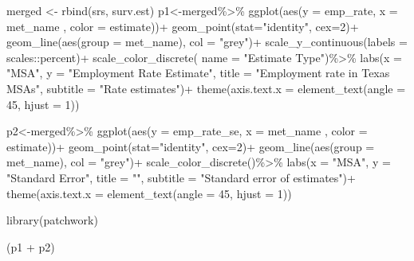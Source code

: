 \documentclass[
]{article}
\newenvironment{Shaded}{\begin{snugshade}}{\end{snugshade}}
\newcommand{\AttributeTok}[1]{\textcolor[rgb]{0.77,0.63,0.00}{#1}}
\newcommand{\DecValTok}[1]{\textcolor[rgb]{0.00,0.00,0.81}{#1}}
\newcommand{\FunctionTok}[1]{\textcolor[rgb]{0.00,0.00,0.00}{#1}}
\newcommand{\NormalTok}[1]{#1}
\newcommand{\OtherTok}[1]{\textcolor[rgb]{0.56,0.35,0.01}{#1}}
\newcommand{\SpecialCharTok}[1]{\textcolor[rgb]{0.00,0.00,0.00}{#1}}
\newcommand{\StringTok}[1]{\textcolor[rgb]{0.31,0.60,0.02}{#1}}
\begin{document}
\begin{Shaded}
\begin{Highlighting}[]
\NormalTok{merged }\OtherTok{\textless{}{-}} \FunctionTok{rbind}\NormalTok{(srs, surv.est)}
\NormalTok{p1}\OtherTok{\textless{}{-}}\NormalTok{merged}\SpecialCharTok{\%\textgreater{}\%}
  \FunctionTok{ggplot}\NormalTok{(}\FunctionTok{aes}\NormalTok{(}\AttributeTok{y =}\NormalTok{ emp\_rate, }\AttributeTok{x =}\NormalTok{ met\_name , }\AttributeTok{color =}\NormalTok{ estimate))}\SpecialCharTok{+}
  \FunctionTok{geom\_point}\NormalTok{(}\AttributeTok{stat=}\StringTok{"identity"}\NormalTok{,}
             \AttributeTok{cex=}\DecValTok{2}\NormalTok{)}\SpecialCharTok{+}
  \FunctionTok{geom\_line}\NormalTok{(}\FunctionTok{aes}\NormalTok{(}\AttributeTok{group =}\NormalTok{ met\_name),}
            \AttributeTok{col =} \StringTok{"grey"}\NormalTok{)}\SpecialCharTok{+}
  \FunctionTok{scale\_y\_continuous}\NormalTok{(}\AttributeTok{labels =}\NormalTok{ scales}\SpecialCharTok{::}\NormalTok{percent)}\SpecialCharTok{+}
  \FunctionTok{scale\_color\_discrete}\NormalTok{( }\AttributeTok{name =} \StringTok{"Estimate Type"}\NormalTok{)}\SpecialCharTok{\%\textgreater{}\%}
  \FunctionTok{labs}\NormalTok{(}\AttributeTok{x =} \StringTok{"MSA"}\NormalTok{, }
       \AttributeTok{y =} \StringTok{"Employment Rate Estimate"}\NormalTok{,}
       \AttributeTok{title =} \StringTok{"Employment rate in Texas MSAs"}\NormalTok{,}
       \AttributeTok{subtitle =} \StringTok{"Rate estimates"}\NormalTok{)}\SpecialCharTok{+}
  \FunctionTok{theme}\NormalTok{(}\AttributeTok{axis.text.x =} \FunctionTok{element\_text}\NormalTok{(}\AttributeTok{angle =} \DecValTok{45}\NormalTok{, }\AttributeTok{hjust =} \DecValTok{1}\NormalTok{))}

\NormalTok{p2}\OtherTok{\textless{}{-}}\NormalTok{merged}\SpecialCharTok{\%\textgreater{}\%}
  \FunctionTok{ggplot}\NormalTok{(}\FunctionTok{aes}\NormalTok{(}\AttributeTok{y =}\NormalTok{ emp\_rate\_se, }\AttributeTok{x =}\NormalTok{ met\_name , }\AttributeTok{color =}\NormalTok{ estimate))}\SpecialCharTok{+}
  \FunctionTok{geom\_point}\NormalTok{(}\AttributeTok{stat=}\StringTok{"identity"}\NormalTok{,}
             \AttributeTok{cex=}\DecValTok{2}\NormalTok{)}\SpecialCharTok{+}
  \FunctionTok{geom\_line}\NormalTok{(}\FunctionTok{aes}\NormalTok{(}\AttributeTok{group =}\NormalTok{ met\_name),}
            \AttributeTok{col =} \StringTok{"grey"}\NormalTok{)}\SpecialCharTok{+}
  \FunctionTok{scale\_color\_discrete}\NormalTok{()}\SpecialCharTok{\%\textgreater{}\%}
  \FunctionTok{labs}\NormalTok{(}\AttributeTok{x =} \StringTok{"MSA"}\NormalTok{, }
       \AttributeTok{y =} \StringTok{"Standard Error"}\NormalTok{,}
       \AttributeTok{title =} \StringTok{""}\NormalTok{,}
       \AttributeTok{subtitle =} \StringTok{"Standard error of estimates"}\NormalTok{)}\SpecialCharTok{+}
  \FunctionTok{theme}\NormalTok{(}\AttributeTok{axis.text.x =} \FunctionTok{element\_text}\NormalTok{(}\AttributeTok{angle =} \DecValTok{45}\NormalTok{, }\AttributeTok{hjust =} \DecValTok{1}\NormalTok{))}

\FunctionTok{library}\NormalTok{(patchwork)}

\NormalTok{(p1 }\SpecialCharTok{+}\NormalTok{ p2)}
\end{Highlighting}
\end{Shaded}
\end{document}
